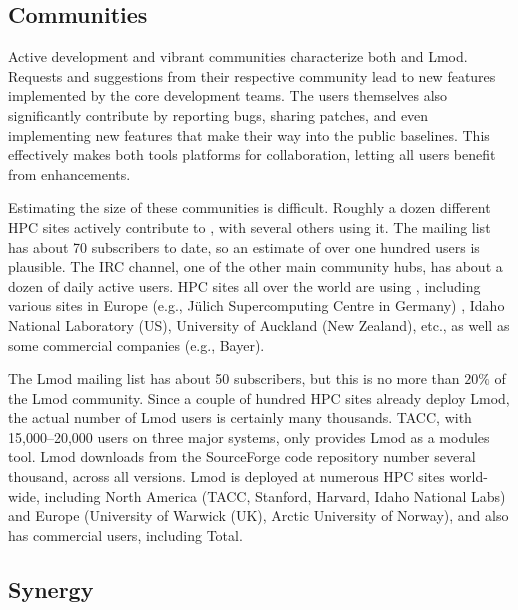 
\subsection{Communities}
\label{sec:communities}

Active development and vibrant communities characterize both \easybuild{} and Lmod.
Requests and suggestions from their respective community lead to new features
implemented by the core development teams. The users themselves also significantly
contribute by reporting bugs, sharing patches, and even implementing new features that
make their way into the public baselines. This effectively makes both tools
platforms for collaboration, letting all users benefit from enhancements.

Estimating the size of these communities is difficult. Roughly a dozen different HPC
sites actively contribute to \easybuild{}, with several others using it.
The \easybuild{} mailing list has about 70 subscribers to date, so an
estimate of over one hundred users is plausible. The \easybuild{} IRC channel, one of
the other main community hubs, has about a dozen of daily active users. HPC sites all
over the world are using \easybuild{}, including various sites in Europe
(e.g., J\"ulich Supercomputing Centre in Germany)
 ,
Idaho National Laboratory (US),
University of Auckland (New Zealand), etc., as well as some commercial companies
(e.g., Bayer).

The Lmod mailing list has about 50 subscribers, but this is no more than $20\%$ of the
Lmod community. Since a couple of hundred HPC sites already deploy Lmod, the actual
number of Lmod users is certainly many thousands. TACC, with 15,000--20,000
users on three major systems, only provides Lmod as a modules tool. Lmod downloads
from the SourceForge code repository number several thousand, across all versions.
Lmod is deployed at numerous HPC sites world-wide, including North America (TACC,
Stanford, Harvard, Idaho National Labs) and Europe (University of Warwick (UK),
Arctic University of Norway), and also has commercial users, including Total.

\subsection{Synergy}

